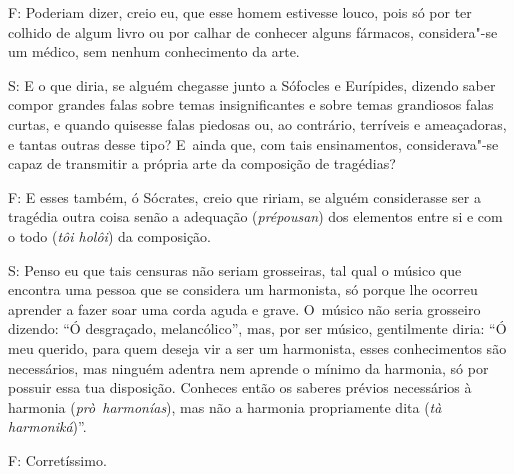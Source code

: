 \bekker{[268c]} F: Poderiam dizer, creio eu, que esse homem estivesse louco,
pois só por ter colhido de algum livro ou por calhar de
conhecer alguns fármacos, considera"-se um médico, sem nenhum
conhecimento da arte.

S: E o que diria, se alguém chegasse junto a Sófocles e Eurípides,
dizendo saber compor grandes falas sobre temas insignificantes e sobre
temas grandiosos falas curtas, e quando quisesse falas piedosas ou, ao
contrário, terríveis e ameaçadoras, e tantas outras desse tipo? E~ainda
que, com tais ensinamentos, considerava"-se capaz de transmitir a própria
arte da composição de tragédias?

 

\bekker{[268d]} F: E esses também, ó Sócrates, creio que ririam, se alguém
considerasse ser a tragédia outra coisa senão a adequação
(\emph{prépousan}) dos elementos entre si e com o todo (\emph{tôi
holôi}) da composição.

S: Penso eu que tais censuras não seriam grosseiras, tal qual o músico
que encontra uma pessoa que se considera um harmonista, só porque lhe
ocorreu aprender a fazer soar uma corda aguda e grave. O~músico não
seria grosseiro dizendo: ``Ó desgraçado, melancólico'', mas, por ser
músico, gentilmente diria: ``Ó meu querido, para quem deseja vir a ser
um harmonista, esses conhecimentos são necessários, mas ninguém adentra
nem aprende o mínimo da harmonia, só por possuir essa tua disposição.
Conheces então os saberes prévios necessários à harmonia
(\emph{prò}~\emph{harmonías}), mas não a harmonia propriamente dita
(\emph{tà harmoniká})''.

 

F: Corretíssimo.

